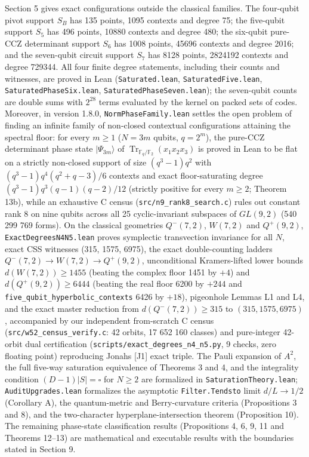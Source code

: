 \documentclass[11pt,a4paper]{article}
\begin{document}
Section 5 gives exact configurations outside the classical families. The four-qubit pivot support
\(S_B\) has 135 points, 1095 contexts and degree 75; the five-qubit support \(S_5\) has 496 points, 10880
contexts and degree 480; the six-qubit pure-CCZ determinant support \(S_6\) has 1008 points, 45696 contexts
and degree 2016; and the seven-qubit circuit support \(S_7\) has 8128 points, 2824192 contexts and degree
729344. All four finite degree statements, including their counts and witnesses, are proved in Lean
(\texttt{Saturated.lean}, \nolinkurl{SaturatedFive.lean}, \nolinkurl{SaturatedPhaseSix.lean}, \nolinkurl{SaturatedPhaseSeven.lean}); the
seven-qubit counts are double sums with \(2^{28}\) terms evaluated by the kernel on packed sets of codes.
Moreover, in version 1.8.0, \nolinkurl{NormPhaseFamily.lean} settles the open problem of finding an infinite family
of non-closed contextual configurations attaining the spectral floor: for every \(m\ge1\) (\(N=3m\) qubits,
\(q=2^m\)), the pure-CCZ determinant phase state \(|\Psi_{3m}\rangle\) of \(\operatorname{Tr}_{\mathbb F_q/\mathbb F_2}(x_1x_2x_3)\)
is proved in Lean to be flat on a strictly non-closed support of size \((q^3-1)q^2\) with
\((q^3-1)q^4(q^2+q-3)/6\) contexts and exact floor-saturating degree \((q^3-1)q^3(q-1)(q-2)/12\)
(strictly positive for every \(m\ge2\); Theorem 13b), while an exhaustive C census (\nolinkurl{src/n9_rank8_search.c})
rules out constant rank 8 on nine qubits across all 25 cyclic-invariant subspaces of \(GL(9,2)\)
(540 299 769 forms). On the classical geometries \(Q^-(7,2)\), \(W(7,2)\) and \(Q^+(9,2)\), \nolinkurl{ExactDegreesN4N5.lean}
proves symplectic transvection invariance for all \(N\), exact CSS witnesses (315, 1575, 6975), the exact
double-counting ladders \(Q^-(7,2)\to W(7,2)\to Q^+(9,2)\), unconditional Kramers-lifted lower bounds
\(d(W(7,2))\ge1455\) (beating the complex floor 1451 by \(+4\)) and \(d(Q^+(9,2))\ge6444\) (beating the real
floor 6200 by \(+244\) and \nolinkurl{five_qubit_hyperbolic_contexts} 6426 by \(+18\)), pigeonhole Lemmas L1 and L4,
and the exact master reduction from \(d(Q^-(7,2))\ge315\) to \((315,1575,6975)\), accompanied by our
independent from-scratch C census (\nolinkurl{src/w52_census_verify.c}: 42 orbits, 17 652 160 classes) and pure-integer
42-orbit dual certification (\nolinkurl{scripts/exact_degrees_n4_n5.py}, 9 checks, zero floating point) reproducing
Jonah\textquotesingle s {[}J1{]} exact triple. The Pauli expansion of \(A^2\), the full five-way saturation equivalence of
Theorems 3 and 4, and the integrality condition \((D-1)|S|=\square\) for \(N\ge2\) are formalized in
\nolinkurl{SaturationTheory.lean}; \nolinkurl{AuditUpgrades.lean} formalizes the asymptotic \texttt{Filter.Tendsto} limit
\(d/L\to1/2\) (Corollary A), the quantum-metric and Berry-curvature criteria (Propositions 3 and 8), and
the two-character hyperplane-intersection theorem (Proposition 10). The remaining phase-state
classification results (Propositions 4, 6, 9, 11 and Theorems 12--13) are mathematical and executable
results with the boundaries stated in Section 9.
\end{document}
